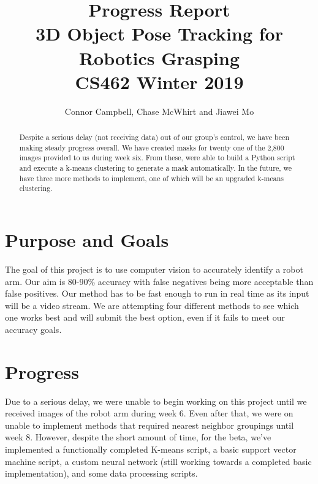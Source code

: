 \documentclass[10pt,journal,compsoc, draftclsnofoot,onecolumn]{IEEEtran}
\begin{document}
\title{
Progress Report\\
3D Object Pose Tracking for Robotics Grasping\\
CS462 Winter 2019
}
\author{Connor Campbell, Chase McWhirt and Jiawei Mo}

\maketitle

\begin{abstract}
Despite a serious delay (not receiving data) out of our group's control, we have been making steady progress overall.
We have created masks for twenty one of the 2,800 images provided to us during week six.
From these, were able to build a Python script and execute a k-means clustering to generate a mask automatically. 
In the future, we have three more methods to implement, one of which will be an upgraded k-means clustering.
\end{abstract}

\IEEEdisplaynontitleabstractindextext
\IEEEpeerreviewmaketitle

\newpage
\pagebreak
\tableofcontents
\pagebreak

\section{Purpose and Goals}
The goal of this project is to use computer vision to accurately identify a robot arm.
Our aim is 80-90\% accuracy with false negatives being more acceptable than false positives.
Our method has to be fast enough to run in real time as its input will be a video stream.
We are attempting four different methods to see which one works best and will submit the best option, even if it fails to meet our accuracy goals.

\noindent
\section{Progress}
Due to a serious delay, we were unable to begin working on this project until we received images of the robot arm during week 6.
Even after that, we were on unable to implement methods that required nearest neighbor groupings until week 8.
However, despite the short amount of time, for the beta, we've implemented a functionally completed K-means script, a basic support vector machine script, a custom neural network (still working towards a completed basic implementation), and some data processing scripts.
\end{document}

